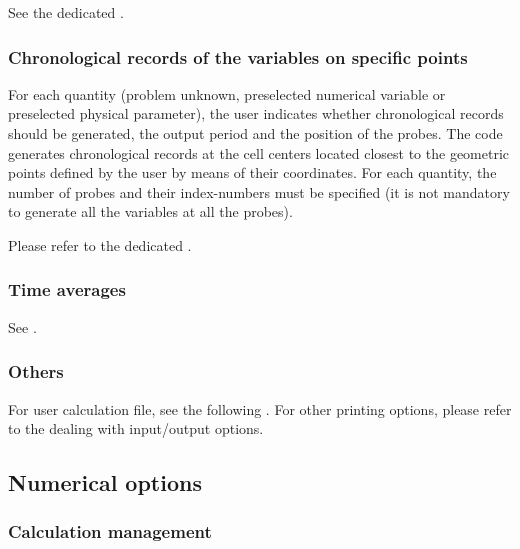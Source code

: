 See the dedicated .

\subsubsection{Chronological records of the variables on specific points}

For each quantity (problem unknown, preselected numerical variable or
preselected physical parameter), the user indicates whether chronological records
should be generated, the output period and the position of the
probes. The code generates chronological records at the cell centers located
closest to the geometric points defined by the user by means of their
coordinates. For each quantity, the number of probes and their
index-numbers must be specified (it is not mandatory to generate all
the variables at all the probes).

Please refer to the dedicated .

\subsubsection{Time averages}
See .

\subsubsection{Others}

For user calculation file, see the following . For other printing options, please refer to the
 dealing with input/output options.

\subsection{Numerical options}
\subsubsection{Calculation management}

